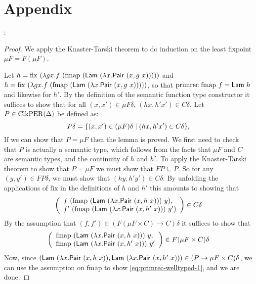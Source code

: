 \section{Appendix}
\label{sec:appendix}

:

\begin{proof}
  We apply the Knaster-Tarski theorem to do induction on the least
  fixpoint $\mu F = F(\mu F)$.

  Let $h = \mathrm{fix}\ (\lambda g x. f\ (\mathrm{fmap}\
  (\semCons{Lam}\ (\lambda x. \semCons{Pair}\ (x, g\ x)))))$ and $h =
  \mathrm{fix}\ (\lambda g x. f\ (\mathrm{fmap}\ (\mathsf{Lam}\
  (\lambda x. \mathsf{Pair}\ (x, g\ x)))))$, so that
  $\mathrm{primrec}\ \mathrm{fmap}\ f = \semCons{Lam}\ h$ and likewise
  for $h'$. By the definition of the semantic function type
  constructor it suffices to show that for all $(x,x') \in \mu F
  \delta$, $(h x, h' x') \in C\delta$. Let $P \in \mathrm{ClkPER}(\Delta)$ be
  defined as:
  \begin{displaymath}
    P\delta = \{ (x,x') \in (\mu F)\delta \mathrel| (h x, h' x') \in C\delta \},
  \end{displaymath}
  If we can show that $P = \mu F$ then the lemma is proved. We first
  need to check that $P$ is actually a semantic type, which follows
  from the facts that $\mu F$ and $C$ are semantic types, and the
  continuity of $h$ and $h'$. To apply the Knaster-Tarski theorem to
  show that $P = \mu F$ we must show that $FP \subseteq P$. So for any
  $(y,y') \in FP\delta$, we must show that $(h y, h' y') \in
  C\delta$. By unfolding the applications of $\mathrm{fix}$ in the
  definitions of $h$ and $h'$ this amounts to showing that
  \begin{displaymath}
    \left(
      \begin{array}{l}
        f\ (\mathrm{fmap}\ (\semCons{Lam}\ (\lambda x. \semCons{Pair}\ (x,h\ x)))\ y),\\
        f'\ (\mathrm{fmap}\ (\semCons{Lam}\ (\lambda x. \semCons{Pair}\ (x,h'\ x)))\ y')
      \end{array}
    \right)\in C\delta
  \end{displaymath}
  By the assumption that $(f,f') \in (F(\mu F \times C) \to C)\delta$
  it suffices to show that
  \begin{equation}
    \label{eq:primrec-welltyped-1}
    \left(
      \begin{array}{l}
        \mathrm{fmap}\ (\semCons{Lam}\ (\lambda x. \semCons{Pair}\ (x,h\ x)))\ y,\\
        \mathrm{fmap}\ (\semCons{Lam}\ (\lambda x. \semCons{Pair}\ (x,h'\ x)))\ y'
      \end{array}
    \right)\in F(\mu F \times C)\delta
  \end{equation}
  Now, since $(\semCons{Lam}\ (\lambda x. \semCons{Pair}\ (x,h\ x)),
  \semCons{Lam}\ (\lambda x. \semCons{Pair}\ (x,h'\ x))) \in (P \to
  \mu F \times C)\delta$, we can use the assumption on $\mathrm{fmap}$
  to show \autoref{eq:primrec-welltyped-1}, and we are done.
\end{proof}

